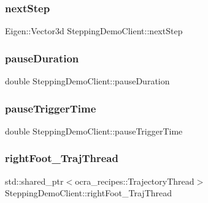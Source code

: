 \subsubsection{\texorpdfstring{next\+Step}{nextStep}}
{\footnotesize\ttfamily Eigen\+::\+Vector3d Stepping\+Demo\+Client\+::next\+Step\hspace{0.3cm}{\ttfamily [private]}}

\hypertarget{classSteppingDemoClient_a92b810b2d2c50e359da18e5d91163340}{}\label{classSteppingDemoClient_a92b810b2d2c50e359da18e5d91163340} 
\subsubsection{\texorpdfstring{pause\+Duration}{pauseDuration}}
{\footnotesize\ttfamily double Stepping\+Demo\+Client\+::pause\+Duration\hspace{0.3cm}{\ttfamily [private]}}

\hypertarget{classSteppingDemoClient_a13a5deff16d52936f788bb9b0af6e9c9}{}\label{classSteppingDemoClient_a13a5deff16d52936f788bb9b0af6e9c9} 
\subsubsection{\texorpdfstring{pause\+Trigger\+Time}{pauseTriggerTime}}
{\footnotesize\ttfamily double Stepping\+Demo\+Client\+::pause\+Trigger\+Time\hspace{0.3cm}{\ttfamily [private]}}

\hypertarget{classSteppingDemoClient_a8b4b931d41b47d9923417506fac107f3}{}\label{classSteppingDemoClient_a8b4b931d41b47d9923417506fac107f3} 
\subsubsection{\texorpdfstring{right\+Foot\+\_\+\+Traj\+Thread}{rightFoot\_TrajThread}}
{\footnotesize\ttfamily std\+::shared\+\_\+ptr$<$ocra\+\_\+recipes\+::\+Trajectory\+Thread$>$ Stepping\+Demo\+Client\+::right\+Foot\+\_\+\+Traj\+Thread\hspace{0.3cm}{\ttfamily [private]}}

